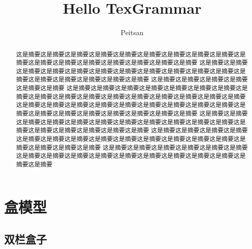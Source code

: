 \documentclass{article}   %
\title{Hello TexGrammar}  %
\author{Peitsan}    %
\begin{document}
	\maketitle
	\begin{abstract}  %
		这是摘要这是摘要这是摘要这是摘要这是摘要这是摘要这是摘要这是摘要这是摘要这是摘要这是摘要这是摘要这是摘要这是摘要这是摘要这是摘要这是摘要	这是摘要这是摘要这是摘要这是摘要这是摘要这是摘要这是摘要这是摘要这是摘要这是摘要这是摘要这是摘要这是摘要这是摘要这是摘要这是摘要这是摘要	这是摘要这是摘要这是摘要这是摘要这是摘要这是摘要
		这是摘要这是摘要这是摘要这是摘要这是摘要这是摘要这是摘要这是摘要这是摘要这是摘要这是摘要这是摘要这是摘要这是摘要这是摘要这是摘要这是摘要	这是摘要这是摘要这是摘要这是摘要这是摘要这是摘要这是摘要这是摘要这是摘要这是摘要这是摘要这是摘要这是摘要这是摘要这是摘要这是摘要这是摘要	这是摘要这是摘要这是摘要这是摘要这是摘要这是摘要这是摘要这是摘要这是摘要这是摘要这是摘要这是摘要这是摘要这是摘要这是摘要这是摘要这是摘要	这是摘要这是摘要这是摘要这是摘要这是摘要这是摘要这是摘要这是摘要这是摘要这是摘要这是摘要这是摘要这是摘要这是摘要这是摘要这是摘要这是摘要	这是摘要这是摘要这是摘要这是摘要这是摘要这是摘要这是摘要这是摘要这是摘要这是摘要这是摘要这是摘要这是摘要这是摘要这是摘要这是摘要这是摘要
	\end{abstract}

\newpage

	\tableofcontents %
	
\newpage
	\section{盒模型}
	 
	  	\subsection{双栏盒子}
	  	
\end{document}
